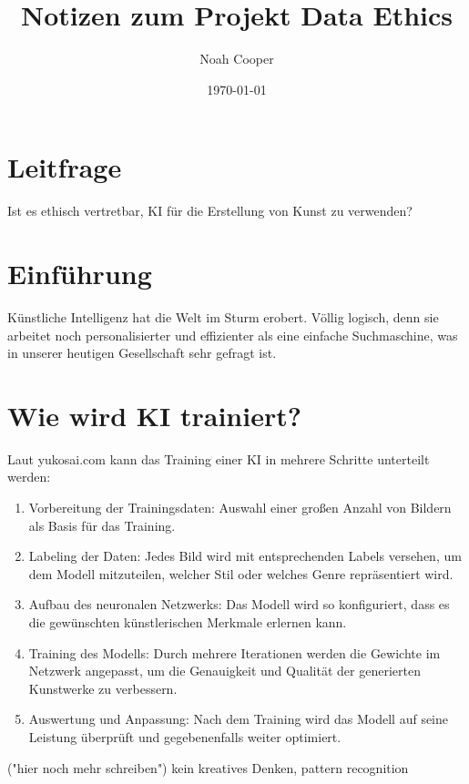 \documentclass{article}
\title{Notizen zum Projekt Data Ethics}
\author{Noah Cooper}
\date{\today}
\begin{document}
\maketitle


\tableofcontents

\newpage

\section{Leitfrage}
    Ist es ethisch vertretbar, KI für die Erstellung von Kunst zu verwenden?

\section{Einführung}
    Künstliche Intelligenz hat die Welt im Sturm erobert. Völlig logisch, denn sie arbeitet noch 
    personalisierter und effizienter als eine einfache Suchmaschine, was in unserer heutigen Gesellschaft 
    sehr gefragt ist. 


\section{Wie wird KI trainiert?}
    Laut yukosai.com kann das Training einer KI in mehrere Schritte unterteilt werden:
    \begin{enumerate}
        \item Vorbereitung der Trainingsdaten: Auswahl einer großen Anzahl von Bildern als Basis für das Training.
        \item Labeling der Daten: Jedes Bild wird mit entsprechenden Labels versehen, um dem Modell mitzuteilen, welcher Stil oder welches Genre repräsentiert wird.
        \item Aufbau des neuronalen Netzwerks: Das Modell wird so konfiguriert, dass es die gewünschten künstlerischen Merkmale erlernen kann.
        \item Training des Modells: Durch mehrere Iterationen werden die Gewichte im Netzwerk angepasst, um die Genauigkeit und Qualität der generierten Kunstwerke zu verbessern.
        \item Auswertung und Anpassung: Nach dem Training wird das Modell auf seine Leistung überprüft und gegebenenfalls weiter optimiert.
    \end{enumerate}
    ("hier noch mehr schreiben")
    kein kreatives Denken, pattern recognition
\end{document}
